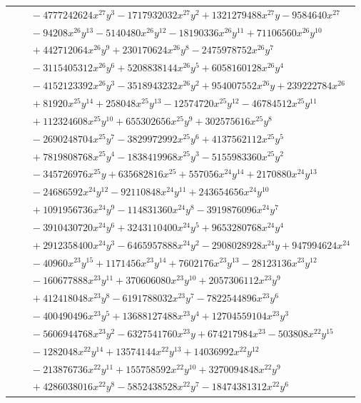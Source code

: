 \documentclass[11pt]{article}
\begin{document}
\begin{longtable}{@{}ll@{}}
 & $\quad -4777242624x^{27}y^{3}-1717932032x^{27}y^{2}+1321279488x^{27}y-9584640x^{27}$\\
 & $\quad -94208x^{26}y^{13}-5140480x^{26}y^{12}-18190336x^{26}y^{11}+71106560x^{26}y^{10}$\\
 & $\quad +442712064x^{26}y^{9}+230170624x^{26}y^{8}-2475978752x^{26}y^{7}$\\
 & $\quad -3115405312x^{26}y^{6}+5208838144x^{26}y^{5}+6058160128x^{26}y^{4}$\\
 & $\quad -4152123392x^{26}y^{3}-3518943232x^{26}y^{2}+954007552x^{26}y+239222784x^{26}$\\
 & $\quad +81920x^{25}y^{14}+258048x^{25}y^{13}-12574720x^{25}y^{12}-46784512x^{25}y^{11}$\\
 & $\quad +112324608x^{25}y^{10}+655302656x^{25}y^{9}+302575616x^{25}y^{8}$\\
 & $\quad -2690248704x^{25}y^{7}-3829972992x^{25}y^{6}+4137562112x^{25}y^{5}$\\
 & $\quad +7819808768x^{25}y^{4}-1838419968x^{25}y^{3}-5155983360x^{25}y^{2}$\\
 & $\quad -345726976x^{25}y+635682816x^{25}+557056x^{24}y^{14}+2170880x^{24}y^{13}$\\
 & $\quad -24686592x^{24}y^{12}-92110848x^{24}y^{11}+243654656x^{24}y^{10}$\\
 & $\quad +1091956736x^{24}y^{9}-114831360x^{24}y^{8}-3919876096x^{24}y^{7}$\\
 & $\quad -3910430720x^{24}y^{6}+3243110400x^{24}y^{5}+9653280768x^{24}y^{4}$\\
 & $\quad +2912358400x^{24}y^{3}-6465957888x^{24}y^{2}-2908028928x^{24}y+947994624x^{24}$\\
 & $\quad -40960x^{23}y^{15}+1171456x^{23}y^{14}+7602176x^{23}y^{13}-28123136x^{23}y^{12}$\\
 & $\quad -160677888x^{23}y^{11}+370606080x^{23}y^{10}+2057306112x^{23}y^{9}$\\
 & $\quad +412418048x^{23}y^{8}-6191788032x^{23}y^{7}-7822544896x^{23}y^{6}$\\
 & $\quad -400490496x^{23}y^{5}+13688127488x^{23}y^{4}+12704559104x^{23}y^{3}$\\
 & $\quad -5606944768x^{23}y^{2}-6327541760x^{23}y+674217984x^{23}-503808x^{22}y^{15}$\\
 & $\quad -1282048x^{22}y^{14}+13574144x^{22}y^{13}+14036992x^{22}y^{12}$\\
 & $\quad -213876736x^{22}y^{11}+155758592x^{22}y^{10}+3270094848x^{22}y^{9}$\\
 & $\quad +4286038016x^{22}y^{8}-5852438528x^{22}y^{7}-18474381312x^{22}y^{6}$\\

\end{longtable}
\end{document}
